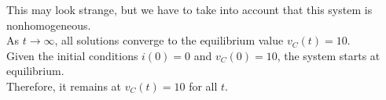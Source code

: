 \documentclass[preview]{standalone}
\begin{document}
\begin{center}
\raggedright
                        This may look strange, but we have to take into account that this system is nonhomogeneous.\\
                        As $t \rightarrow \infty$, all solutions converge to the equilibrium value $v_C(t) = 10$. \\
                        Given the initial conditions $i(0) = 0$ and $v_C(0) = 10$, the system starts at equilibrium. \\
                        Therefore, it remains at $v_C(t) = 10$ for all $t$.
\end{center}
\end{document}
